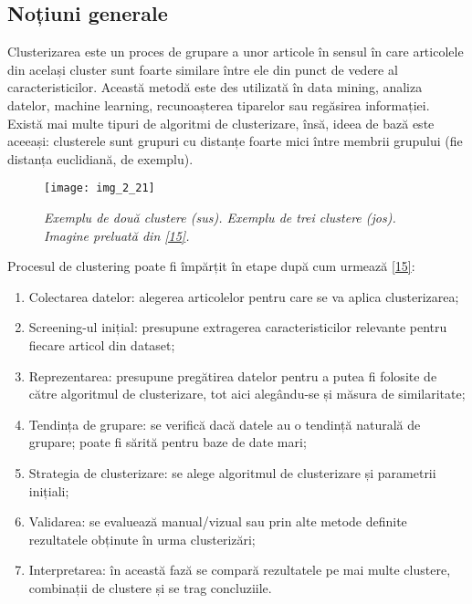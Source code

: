 \subsection{Noțiuni generale}

Clusterizarea este un proces de grupare a unor articole în sensul în care articolele din același cluster sunt foarte similare între ele din punct de vedere al caracteristicilor. Această metodă este des utilizată în data mining, analiza datelor, machine learning, recunoașterea tiparelor sau regăsirea informației. Există mai multe tipuri de algoritmi de clusterizare, însă, ideea de bază este aceeași: clusterele sunt grupuri cu distanțe foarte mici între membrii grupului (fie distanța euclidiană, de exemplu).
\begin{figure}[!h]
	\centering
	\texttt{[image: img\_2\_21]}
	\caption[Exemplu clustere]{\textit{Exemplu de două clustere (sus). Exemplu de trei clustere (jos). Imagine preluată din \hyperlink{dataclusteringtechniques}{[15]}.}}
\end{figure}  

Procesul de clustering poate fi împărțit în etape după cum urmează \hyperlink{dataclusteringtechniques}{[15]}:
\begin{enumerate}
	\item Colectarea datelor: alegerea articolelor pentru care se va aplica clusterizarea;
	\item Screening-ul inițial: presupune extragerea caracteristicilor relevante pentru fiecare articol din dataset;
	\item Reprezentarea: presupune pregătirea datelor pentru a putea fi folosite de către algoritmul de clusterizare, tot aici alegându-se și măsura de similaritate;
	\item Tendința de grupare: se verifică dacă datele au o tendință naturală de grupare; poate fi sărită pentru baze de date mari;
	\item Strategia de clusterizare: se alege algoritmul de clusterizare și parametrii inițiali;
	\item Validarea: se evaluează manual/vizual sau prin alte metode definite rezultatele obținute în urma clusterizări;
	\item Interpretarea: în această fază se compară rezultatele pe mai multe clustere, combinații de clustere și se trag concluziile.
\end{enumerate}


